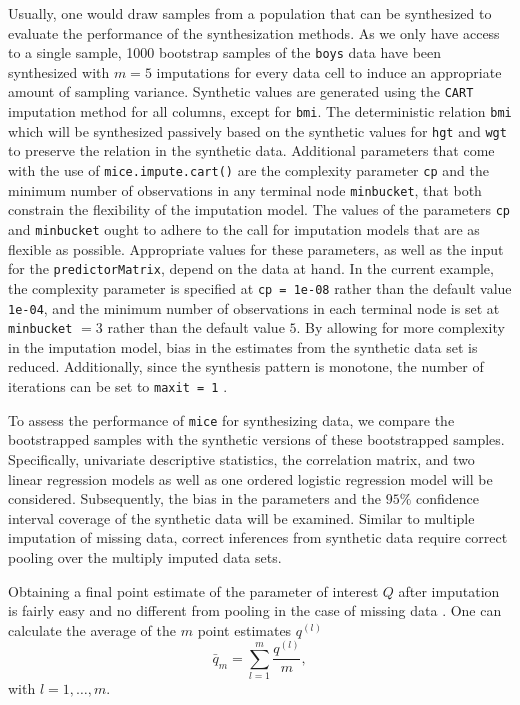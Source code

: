 \documentclass[psych,article,submit,moreauthors,pdftex]{mdpi}
\begin{document}
Usually, one would draw samples from a population that can be
synthesized to evaluate the performance of the synthesization methods.
As we only have access to a single sample, 1000 bootstrap samples of the
\texttt{boys} data have been synthesized with \(m = 5\) imputations for
every data cell to induce an appropriate amount of sampling variance.
Synthetic values are generated using the \texttt{CART} imputation method
for all columns, except for \texttt{bmi}. The deterministic relation
\texttt{bmi} which will be synthesized passively based on the synthetic
values for \texttt{hgt} and \texttt{wgt} to preserve the relation in the
synthetic data. Additional parameters that come with the use of
\texttt{mice.impute.cart()} are the complexity parameter \texttt{cp} and
the minimum number of observations in any terminal node
\texttt{minbucket}, that both constrain the flexibility of the
imputation model. The values of the parameters \texttt{cp} and
\texttt{minbucket} ought to adhere to the call for imputation models
that are as flexible as possible. Appropriate values for these
parameters, as well as the input for the \texttt{predictorMatrix},
depend on the data at hand. In the current example, the complexity
parameter is specified at \texttt{cp\ =\ 1e-08} rather than the default
value \texttt{1e-04}, and the minimum number of observations in each
terminal node is set at \texttt{minbucket} \(= 3\) rather than the
default value \(5\). By allowing for more complexity in the imputation
model, bias in the estimates from the synthetic data set is reduced.
Additionally, since the synthesis pattern is monotone, the number of
iterations can be set to \texttt{maxit\ =\ 1} \citep[e.g.,][Ch.
3]{drechsler_synthetic_2011}.

To assess the performance of \texttt{mice} for synthesizing data, we
compare the bootstrapped samples with the synthetic versions of these
bootstrapped samples. Specifically, univariate descriptive statistics,
the correlation matrix, and two linear regression models as well as one
ordered logistic regression model will be considered. Subsequently, the
bias in the parameters and the \(95\%\) confidence interval coverage of
the synthetic data will be examined. Similar to multiple imputation of
missing data, correct inferences from synthetic data require correct
pooling over the multiply imputed data sets.

Obtaining a final point estimate of the parameter of interest \(Q\)
after imputation is fairly easy and no different from pooling in the
case of missing data \citep{rubin_multiple_1987}. One can calculate the
average of the \(m\) point estimates \(q^{(l)}\) \[
\bar{q}_m = \sum_{l = 1}^m \frac{q^{(l)}}{m},
\] with \(l = 1, \dots, m\).
\end{document}
